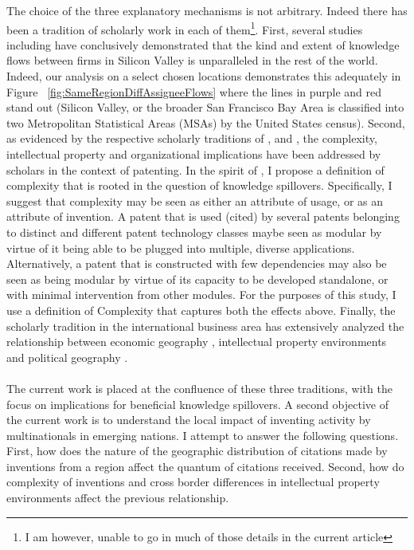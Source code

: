 \documentclass[12pt]{article}
\begin{document}
The choice of the three explanatory mechanisms is not arbitrary. Indeed there has been a tradition of scholarly work in each of them\footnote{I am however, unable to go in much of those details in the current article}. First, several studies including \cite{Almeida1999} have conclusively demonstrated that the kind and extent of knowledge flows between firms in Silicon Valley is unparalleled in the rest of the world. Indeed, our analysis on a select chosen locations demonstrates this adequately in Figure ~\ref{fig:SameRegionDiffAssigneeFlows} where the lines in purple and red stand out (Silicon Valley, or the broader San Francisco Bay Area is classified into two Metropolitan Statistical Areas (MSAs) by the United States census). Second, as evidenced by the respective scholarly traditions of \cite{Baldwin2015}, \cite{Ethiraj2004b}  and \cite{Yayavaram2008}, the complexity, intellectual property and organizational implications have been addressed by scholars in the context of patenting. In the spirit of \cite{Ethiraj2004b}, I propose a definition of complexity that is rooted in the question of knowledge spillovers. Specifically, I suggest that complexity may be seen as either an attribute of usage, or as an attribute of invention. A patent that is used (cited) by several patents belonging to distinct and different patent technology classes maybe seen as modular by virtue of it being able to be plugged into multiple, diverse applications. Alternatively, a patent that is constructed with few dependencies may also be seen as being modular by virtue of its capacity to be developed standalone, or with minimal intervention from other modules. For the purposes of this study, I use a definition of Complexity that captures both the effects above. Finally, the scholarly tradition in the international business area has extensively analyzed the relationship between economic geography \cite{Singh2007}, intellectual property environments \citep{Zhao2006} and political geography \citep{Singh2013}.
\\\\
The current work is placed at the confluence of these three traditions, with the focus on implications for beneficial knowledge spillovers. A second objective of the current work is to understand the local impact of inventing activity by multinationals in emerging nations. I attempt to answer the following questions. First, how does the nature of the geographic distribution of citations made by inventions from a region affect the quantum of citations received. Second, how do complexity of inventions and cross border differences in intellectual property environments affect the previous relationship. 
\end{document}
